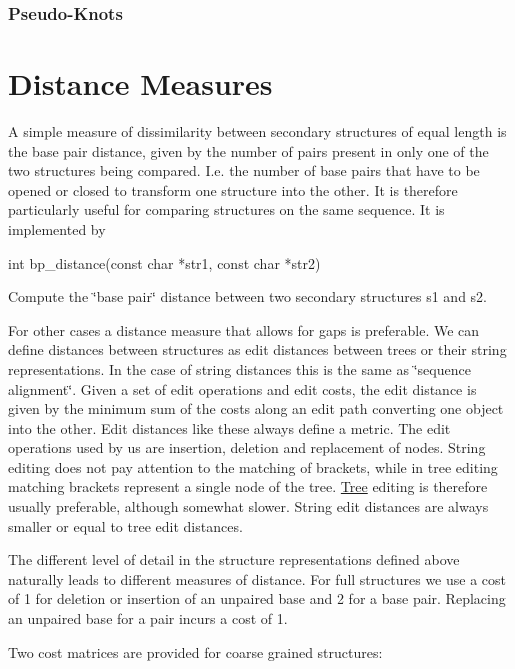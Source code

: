 \hypertarget{secondary_structures_pseudo-knots}{}\subsubsection{Pseudo-\/\+Knots}\label{secondary_structures_pseudo-knots}
\hypertarget{distance_measures}{}\section{Distance Measures}\label{distance_measures}
A simple measure of dissimilarity between secondary structures of equal length is the base pair distance, given by the number of pairs present in only one of the two structures being compared. I.\+e. the number of base pairs that have to be opened or closed to transform one structure into the other. It is therefore particularly useful for comparing structures on the same sequence. It is implemented by

\begin{DoxyVerb}int bp_distance(const char *str1,
                const char *str2)
\end{DoxyVerb}
 Compute the \char`\"{}base pair\char`\"{} distance between two secondary structures s1 and s2.

For other cases a distance measure that allows for gaps is preferable. We can define distances between structures as edit distances between trees or their string representations. In the case of string distances this is the same as \char`\"{}sequence alignment\char`\"{}. Given a set of edit operations and edit costs, the edit distance is given by the minimum sum of the costs along an edit path converting one object into the other. Edit distances like these always define a metric. The edit operations used by us are insertion, deletion and replacement of nodes. String editing does not pay attention to the matching of brackets, while in tree editing matching brackets represent a single node of the tree. \mbox{\hyperlink{struct_tree}{Tree}} editing is therefore usually preferable, although somewhat slower. String edit distances are always smaller or equal to tree edit distances.

The different level of detail in the structure representations defined above naturally leads to different measures of distance. For full structures we use a cost of 1 for deletion or insertion of an unpaired base and 2 for a base pair. Replacing an unpaired base for a pair incurs a cost of 1.

Two cost matrices are provided for coarse grained structures\+:

